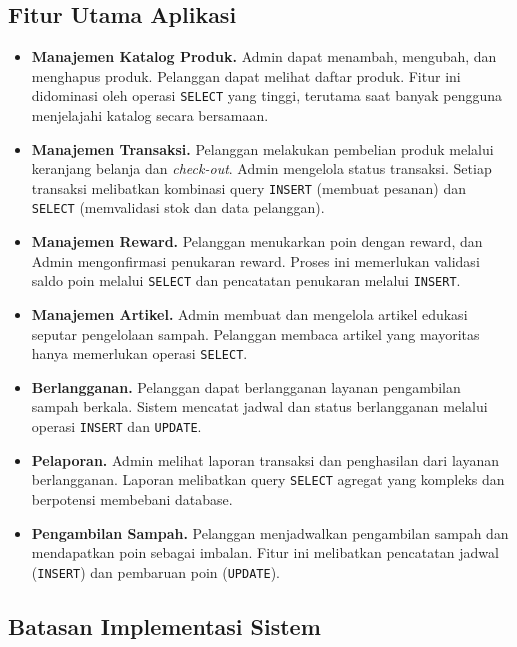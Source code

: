 \subsection{Fitur Utama Aplikasi}

\begin{itemize}
    \item \textbf{Manajemen Katalog Produk.} Admin dapat menambah,
    mengubah, dan menghapus produk. Pelanggan dapat melihat daftar
    produk. Fitur ini didominasi oleh operasi \texttt{SELECT} yang
    tinggi, terutama saat banyak pengguna menjelajahi katalog secara
    bersamaan.
    \item \textbf{Manajemen Transaksi.} Pelanggan melakukan pembelian
    produk melalui keranjang belanja dan \textit{check-out}. Admin
    mengelola status transaksi. Setiap transaksi melibatkan kombinasi
    query \texttt{INSERT} (membuat pesanan) dan \texttt{SELECT}
    (memvalidasi stok dan data pelanggan).
    \item \textbf{Manajemen Reward.} Pelanggan menukarkan poin dengan
    reward, dan Admin mengonfirmasi penukaran reward. Proses ini
    memerlukan validasi saldo poin melalui \texttt{SELECT} dan
    pencatatan penukaran melalui \texttt{INSERT}.
    \item \textbf{Manajemen Artikel.} Admin membuat dan mengelola
    artikel edukasi seputar pengelolaan sampah. Pelanggan membaca
    artikel yang mayoritas hanya memerlukan operasi \texttt{SELECT}.
    \item \textbf{Berlangganan.} Pelanggan dapat berlangganan layanan
    pengambilan sampah berkala. Sistem mencatat jadwal dan status
    berlangganan melalui operasi \texttt{INSERT} dan \texttt{UPDATE}.
    \item \textbf{Pelaporan.} Admin melihat laporan transaksi dan
    penghasilan dari layanan berlangganan. Laporan melibatkan query
    \texttt{SELECT} agregat yang kompleks dan berpotensi membebani
    database.
    \item \textbf{Pengambilan Sampah.} Pelanggan menjadwalkan
    pengambilan sampah dan mendapatkan poin sebagai imbalan. Fitur ini
    melibatkan pencatatan jadwal (\texttt{INSERT}) dan pembaruan poin
    (\texttt{UPDATE}).
\end{itemize}

\subsection{Batasan Implementasi Sistem}

